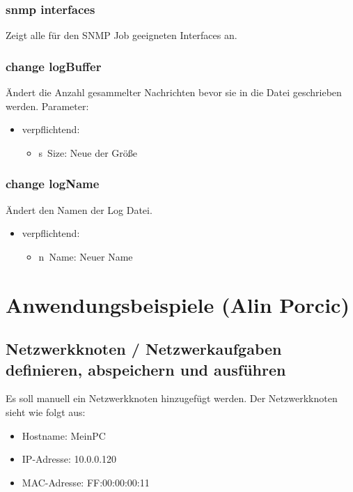 \documentclass[12pt,a4paper]{report}
\begin{document}
\begin{onehalfspace}
\subsubsection{snmp interfaces}

Zeigt alle für den SNMP Job geeigneten Interfaces an.

\subsubsection{change logBuffer} 

Ändert die Anzahl gesammelter Nachrichten bevor sie in die Datei geschrieben werden.
Parameter:\\
\begin{itemize}
\item verpflichtend:
\begin{itemize}
\item \glqq s\grqq \ Size: Neue der Größe
\end{itemize}
\end{itemize}

\subsubsection{change logName}

Ändert den Namen der Log Datei.

\begin{itemize}
\item verpflichtend:
\begin{itemize}
\item \glqq n\grqq \ Name: Neuer Name
\end{itemize}
\end{itemize}

\newpage
{}
\section{Anwendungsbeispiele (Alin Porcic)}

\subsection{Netzwerkknoten / Netzwerkaufgaben definieren, abspeichern und ausführen}

Es soll manuell ein Netzwerkknoten hinzugefügt werden. Der Netzwerkknoten sieht wie folgt aus:

\begin{itemize}
  \item Hostname: MeinPC
  \item IP-Adresse: 10.0.0.120
  \item MAC-Adresse: FF:00:00:00:11
\end{itemize}


\end{onehalfspace}
\end{document}
